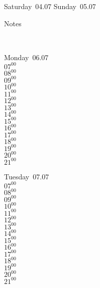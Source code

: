 \documentclass[11pt,a4paper]{book}\usepackage[]{graphicx}\usepackage[]{color}
\begin{document}
{\begin{tcolorbox}
\end{tcolorbox} 
\begin{tcolorbox}[height=(\textheight-10mm)/6]
Saturday~04.07
\tcblower
Sunday~05.07
\end{tcolorbox} %
\begin{tcolorbox}[height=(\textheight-10mm)/6,sidebyside=false]
Notes
\end{tcolorbox}
\clearpage
\vspace{2 mm}\\
\begin{tcolorbox}
Monday~06.07\\
{ 
  $07^{00}$\\
$08^{00}$\\
$09^{00}$\\
$10^{00}$\\
$11^{00}$\\
$12^{00}$\\
$13^{00}$\\
$14^{00}$\\
$15^{00}$\\
$16^{00}$\\
$17^{00}$\\
$18^{00}$\\
$19^{00}$\\
$20^{00}$\\
$21^{00}$}\\

\end{tcolorbox}
\begin{tcolorbox}
Tuesday~07.07\\
{ 
  $07^{00}$\\
$08^{00}$\\
$09^{00}$\\
$10^{00}$\\
$11^{00}$\\
$12^{00}$\\
$13^{00}$\\
$14^{00}$\\
$15^{00}$\\
$16^{00}$\\
$17^{00}$\\
$18^{00}$\\
$19^{00}$\\
$20^{00}$\\
$21^{00}$}\\


\end{tcolorbox}}
\end{document}
